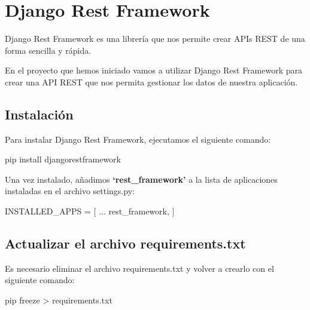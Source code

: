 \documentclass[
  a4paper,
  DIV=11,
  numbers=noendperiod,
  onepage,
  openany]{scrreprt}
\newenvironment{Shaded}{\begin{snugshade}}{\end{snugshade}}
\newcommand{\ExtensionTok}[1]{\textcolor[rgb]{0.00,0.23,0.31}{#1}}
\newcommand{\NormalTok}[1]{\textcolor[rgb]{0.00,0.23,0.31}{#1}}
\newcommand{\OperatorTok}[1]{\textcolor[rgb]{0.37,0.37,0.37}{#1}}
\newcommand{\StringTok}[1]{\textcolor[rgb]{0.13,0.47,0.30}{#1}}
\begin{document}
\chapter{Django Rest Framework}\label{django-rest-framework}

Django Rest Framework es una librería que nos permite crear APIs REST de
una forma sencilla y rápida.

En el proyecto que hemos iniciado vamos a utilizar Django Rest Framework
para crear una API REST que nos permita gestionar los datos de nuestra
aplicación.

\section{Instalación}\label{instalaciuxf3n}

Para instalar Django Rest Framework, ejecutamos el siguiente comando:

\begin{Shaded}
\begin{Highlighting}[]
\ExtensionTok{pip}\NormalTok{ install djangorestframework}
\end{Highlighting}
\end{Shaded}

Una vez instalado, añadimos \textbf{`rest\_framework'} a la lista de
aplicaciones instaladas en el archivo settings.py:

\begin{Shaded}
\begin{Highlighting}[]
\NormalTok{INSTALLED\_APPS }\OperatorTok{=}\NormalTok{ [}
\NormalTok{    ...}
    \StringTok{\textquotesingle{}rest\_framework\textquotesingle{}}\NormalTok{,}
\NormalTok{]}
\end{Highlighting}
\end{Shaded}

\section{Actualizar el archivo
requirements.txt}\label{actualizar-el-archivo-requirements.txt}

Es necesario eliminar el archivo requirements.txt y volver a crearlo con
el siguiente comando:

\begin{Shaded}
\begin{Highlighting}[]
\ExtensionTok{pip}\NormalTok{ freeze }\OperatorTok{\textgreater{}}\NormalTok{ requirements.txt}
\end{Highlighting}
\end{Shaded}
\end{document}
